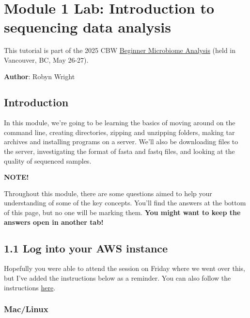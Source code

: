 \documentclass[
]{book}
\newenvironment{bluebox}{
  \definecolor{shadecolor}{RGB}{172, 210, 237}
  \color{white}
  \begin{shaded}}
 {\end{shaded}}
\begin{document}
\chapter{Module 1 Lab: Introduction to sequencing data analysis}\label{module-1-lab-introduction-to-sequencing-data-analysis}

This tutorial is part of the 2025 CBW \href{https://bioinformaticsdotca.github.io/BMB_2025/}{Beginner Microbiome Analysis} (held in Vancouver, BC, May 26-27).

\textbf{Author}: Robyn Wright

\section{Introduction}\label{introduction}

In this module, we're going to be learning the basics of moving around on the command line, creating directories, zipping and unzipping folders, making tar archives and installing programs on a server. We'll also be downloading files to the server, investigating the format of fasta and fastq files, and looking at the quality of sequenced samples.

\begin{bluebox}

\begin{center}
\textbf{NOTE!}

\end{center}

Throughout this module, there are some questions aimed to help your understanding of some of the key concepts. You'll find the answers at the bottom of this page, but no one will be marking them. \textbf{You might want to keep the answers open in another tab!}

\end{bluebox}

\section{1.1 Log into your AWS instance}\label{log-into-your-aws-instance}

Hopefully you were able to attend the session on Friday where we went over this, but I've added the instructions below as a reminder. You can also follow the instructions \href{https://github.com/bioinformaticsdotca/AWS_stuff/blob/master/Logging_into_the_Amazon_cloud.md}{here}.

\subsection{Mac/Linux}\label{maclinux}
\end{document}
